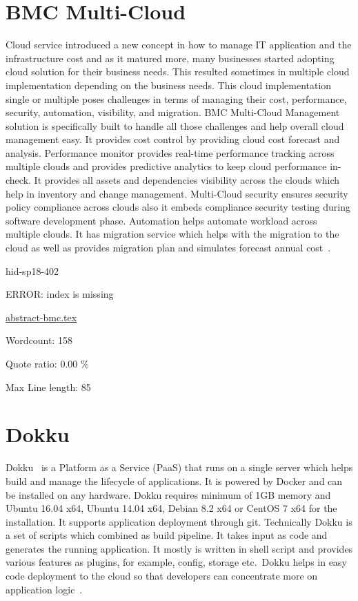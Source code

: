 \section{BMC Multi-Cloud}
Cloud service introduced a new concept in how to manage IT application
and the infrastructure cost and as it matured more, many businesses
started adopting cloud solution for their business needs. This
resulted sometimes in multiple cloud implementation depending on the
business needs. This cloud implementation single or multiple poses
challenges in terms of managing their cost, performance, security,
automation, visibility, and migration. BMC Multi-Cloud Management
solution is specifically built to handle all those challenges and
help overall cloud management easy. It provides cost control by
providing cloud cost forecast and analysis. Performance monitor
provides real-time performance tracking across multiple clouds and
provides predictive analytics to keep cloud performance in-check. It
provides all assets and dependencies visibility across the clouds which help in
inventory and change management. Multi-Cloud security ensures security
policy compliance across clouds also it embeds compliance security testing
during software development phase. Automation helps automate workload across multiple
clouds. It has migration service which helps with the migration to the
cloud as well as provides migration plan and simulates forecast annual
cost~\cite{hid-sp18-402-bmc}.


\begin{IU}

hid-sp18-402

ERROR: index is missing

\href{https://github.com/cloudmesh-community/hid-sp18-402/blob/master//technology/abstract-bmc.tex}{abstract-bmc.tex}

 

Wordcount: 158


Quote ratio: 0.00 \%
 
Max Line length: 85
\end{IU}

\section{Dokku}
Dokku~\cite{hid-sp18-402-www-dokku} is a Platform as a Service (PaaS)
that runs on a single server which helps build and manage the
lifecycle of applications. It is powered by Docker and can be
installed on any hardware. Dokku requires minimum of 1GB memory and
Ubuntu 16.04 x64, Ubuntu 14.04 x64, Debian 8.2 x64 or CentOS 7 x64 for
the installation. It supports application deployment through
git. Technically Dokku is a set of scripts which combined as build
pipeline. It takes input as code and generates the running application. It
mostly is written in shell script and provides various features as
plugins, for example, config, storage etc.\ Dokku helps in easy code
deployment to the cloud so that developers can concentrate more on
application logic~\cite{hid-sp18-402-www-dokkuG}.


